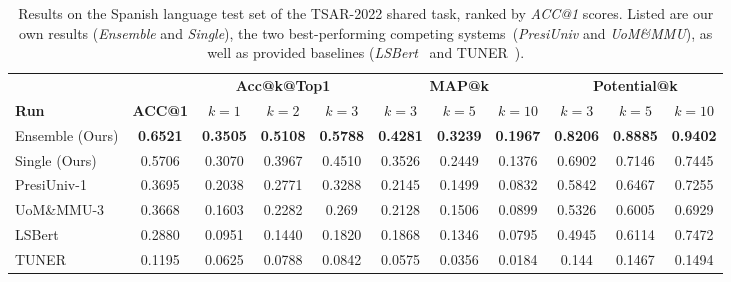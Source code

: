 \documentclass[11pt]{article}
\begin{document}
\begin{table*}
	\hspace*{-0.35cm}
	\setlength{\tabcolsep}{3pt}
	\centering
	\begin{tabular}{l|c|ccc|ccc|ccc}
		&       & \multicolumn{3}{c|}{\textbf{Acc@k@Top1}} & \multicolumn{3}{c|}{\textbf{MAP@k}} & \multicolumn{3}{c}{\textbf{Potential@k}}\\
		\textbf{Run} & \textbf{ACC@1} & $k=1$ & $k=2$ & $k=3$ & $k=3$ & $k=5$ & $k=10$ & $k=3$ & $k=5$ & $k=10$\\
		\hline
		Ensemble (Ours) & \textbf{0.6521} & \textbf{0.3505} & \textbf{0.5108} & \textbf{0.5788} & \textbf{0.4281} & \textbf{0.3239} & \textbf{0.1967} & \textbf{0.8206} & \textbf{0.8885} & \textbf{0.9402}\\
		Single (Ours) & 0.5706 & 0.3070 & 0.3967 & 0.4510 & 0.3526 & 0.2449 & 0.1376 & 0.6902 & 0.7146 & 0.7445\\
		\hline
		PresiUniv-1 & 0.3695 & 0.2038 & 0.2771 & 0.3288 & 0.2145 & 0.1499 & 0.0832 & 0.5842 & 0.6467 & 0.7255\\
		UoM\&MMU-3 & 0.3668 & 0.1603 & 0.2282 & 0.269 & 0.2128 & 0.1506 & 0.0899 & 0.5326 & 0.6005 & 0.6929\\
		LSBert & 0.2880 & 0.0951 & 0.1440 & 0.1820 & 0.1868 & 0.1346 & 0.0795 & 0.4945 & 0.6114 & 0.7472\\
		TUNER & 0.1195 & 0.0625 & 0.0788 & 0.0842 & 0.0575 & 0.0356 & 0.0184 & 0.144 & 0.1467 & 0.1494 \\
	\end{tabular}
	\caption{Results on the Spanish language test set of the TSAR-2022 shared task, ranked by \emph{ACC@1} scores. Listed are our own results (\emph{Ensemble} and  \emph{Single}), the two best-performing competing systems~(\emph{PresiUniv} and \emph{UoM\&MMU}), as well as provided baselines (\emph{LSBert}~\cite{qiang-etal-2020-lexical} and TUNER~\cite{ferres-etal-2017-adaptable}).}
	\label{tab:spanish}
\end{table*}
	
\end{document}
